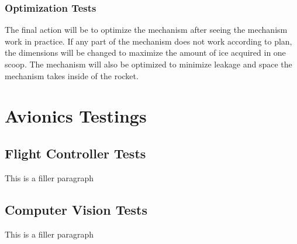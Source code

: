 		\subsubsection{Optimization Tests}
		The final action will be to optimize the mechanism after seeing the mechanism work in practice. If any part of the mechanism does not work according to plan, the dimensions will be changed to maximize the amount of ice acquired in one scoop. The mechanism will also be optimized to minimize leakage and space the mechanism takes inside of the rocket.   

\section{Avionics Testings}\label{PL:Testing:Avionics}
	\subsection{Flight Controller Tests}
		This is a filler paragraph

	\subsection{Computer Vision Tests}
		This is a filler paragraph





